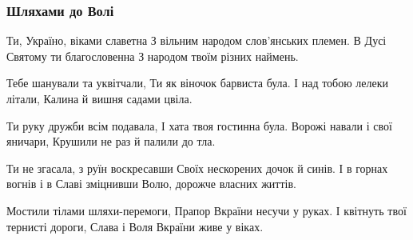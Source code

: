  
 
 

\subsubsection{Шляхами до Волі}
\label{sec:poetry.rus.sokor.roads_to_freedom}

Ти, Україно, віками славетна
З вільним народом слов'янських племен.
В Дусі Святому ти благословенна
З народом твоїм різних наймень.

Тебе шанували та уквітчали,
Ти як віночок барвиста була.
І над тобою лелеки літали,
Калина й вишня садами цвіла.

Ти руку дружби всім подавала,
І хата твоя гостинна була.
Ворожі навали і свої яничари,
Крушили не раз й палили до тла.

Ти не згасала, з руїн воскресавши
Своїх нескорених дочок й синів.
І в горнах вогнів і в Славі зміцнивши
Волю, дорожче власних життів.

Мостили тілами шляхи-перемоги,
Прапор Вкраїни несучи у руках.
І квітнуть твої тернисті дороги,
Слава і Воля Вкраїни живе у віках. 
